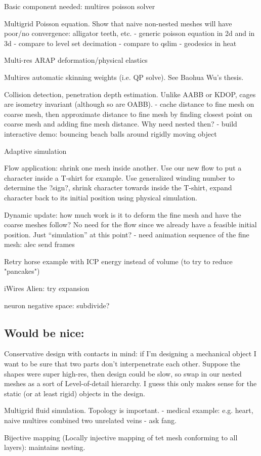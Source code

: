 Basic component needed: multires poisson solver

Multigrid Poisson equation. Show that naive non-nested meshes will have
poor/no convergence: alligator teeth, etc.
  - generic poisson equation in 2d and in 3d
    - compare to level set decimation
    - compare to qslim
  - geodesics in heat 

Multi-res ARAP deformation/physical elastics

Multires automatic skinning weights (i.e. QP solve). See Baohua Wu's thesis.

Collision detection, penetration depth estimation. Unlike AABB or KDOP, cages
are isometry invariant (although so are OABB).
  - cache distance to fine mesh on coarse mesh, then approximate distance to
    fine mesh by finding closest point on coarse mesh and adding fine mesh
    distance. Why need nested then?
  - build interactive demo: bouncing beach balls around rigidly moving object

Adaptive simulation \cite{Debunne:2001:DRD}

Flow application: shrink one mesh inside another. Use our new flow to put a 
character inside a T-shirt for example. Use generalized winding number to 
determine the ?sign?, shrink character towards inside the T-shirt, 
expand character back to its initial position using physical simulation. 

Dynamic update: how much work is it to deform the fine mesh and have the coarse
meshes follow? No need for the flow since we already have a feasible initial
position. Just ``simulation'' at this point?
  - need animation sequence of the fine mesh: alec send frames

Retry horse example with ICP energy instead of volume (to try to reduce
"pancakes")

iWires Alien: try expansion 

neuron negative space: subdivide?

\subsection{Would be nice:}

Conservative design with contacts in mind: if I'm designing a mechanical object
I want to be sure that two parts don't interpenetrate each other. Suppose the
shapes were super high-res, then design could be slow, so swap in our nested
meshes as a sort of Level-of-detail hierarchy. I guess this only makes sense
for the static (or at least rigid) objects in the design.

Multigrid fluid simulation. Topology is important.
  - medical example: e.g. heart, naive multires combined two unrelated veins
  - ask fang.

Bijective mapping (Locally injective mapping of tet mesh conforming to all
layers): maintains nesting.
